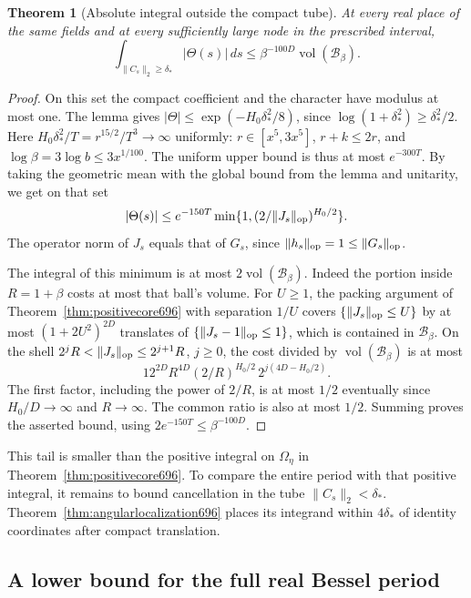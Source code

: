 \documentclass[a4paper,11pt]{article}
\newtheorem{theorem}[proposition]{Theorem}
\theoremstyle{definition}
\theoremstyle{remark}
\numberwithin{equation}{section}
\begin{document}
\begin{theorem}[Absolute integral outside the compact tube]\leavevmode
\label{thm:noncompacttail697}
At every real place of the same fields and at every sufficiently
large node in the prescribed interval,
\[
   \int_{\|C_s\|_2\ge\delta_*} |\Theta(s)|\,ds
       \le \beta^{-100D}\operatorname{vol}(\mathcal B_\beta).
\]
\end{theorem}
\begin{proof}
On this set the compact coefficient and the character have
modulus at most one. The lemma gives
\(|\Theta|\le\exp(-H_0\delta_*^2/8)\), since
\(\log(1+\delta_*^2)\ge\delta_*^2/2\).
Here \(H_0\delta_*^2/T=r^{15/2}/T^3\to\infty\) uniformly:
\(r\in[x^5,3x^5]\), \(r+k\le2r\), and
\(\log\beta=3\log b\le3x^{1/100}\). The uniform upper bound
is thus at most \(e^{-300T}\). By taking the geometric
mean with the global bound from the lemma and unitarity,
we get on that set
\[
  |\Theta(s)|\le e^{-150T}
           \min\{1,(2/\|J_s\|_{\rm op})^{H_0/2}\}.
\]
The operator norm of \(J_s\) equals that of \(G_s\), since
\(\|h_s\|_{\rm op}=1\le\|G_s\|_{\rm op}\).

The integral of this minimum is at most
\(2\operatorname{vol}(\mathcal B_\beta)\).
Indeed the portion inside \(R=1+\beta\) costs at most that
ball's volume. For \(U\ge1\), the packing argument of
Theorem~\ref{thm:positivecore696} with separation \(1/U\)
covers \(\{\|J_s\|_{\rm op}\le U\}\) by at most
\((1+2U^2)^{2D}\) translates of \(\{\|J_s-1\|_{\rm op}\le1\}\),
which is contained in \(\mathcal B_\beta\).
On the shell \(2^jR<\|J_s\|_{\rm op}\le2^{j+1}R\), \(j\ge0\),
the cost divided by \(\operatorname{vol}(\mathcal B_\beta)\)
is at most
\[
  12^{2D} R^{4D}(2/R)^{H_0/2}\,2^{j(4D-H_0/2)} .
\]
The first factor, including the power of \(2/R\), is at most
\(1/2\) eventually since \(H_0/D\to\infty\) and \(R\to\infty\).
The common ratio is also at most \(1/2\). Summing proves the
asserted bound, using \(2e^{-150T}\le\beta^{-100D}\).
\end{proof}

This tail is smaller than the positive integral on
\(\Omega_\eta\) in Theorem~\ref{thm:positivecore696}.
To compare the entire period with that positive integral,
it remains to bound cancellation in the tube
\(\|C_s\|_2<\delta_*\). Theorem~\ref{thm:angularlocalization696}
places its integrand within \(4\delta_*\) of identity
coordinates after compact translation.


\subsection{A lower bound for the full real Bessel period}
\label{sec:fullrealperiod698}
\end{document}
